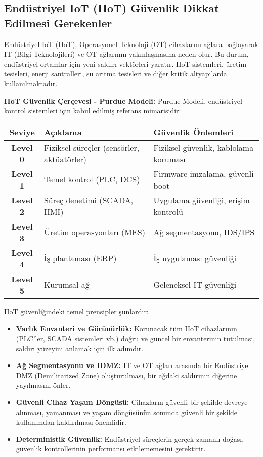\subsection{Endüstriyel IoT (IIoT) Güvenlik Dikkat Edilmesi Gerekenler}

Endüstriyel IoT (IIoT), Operasyonel Teknoloji (OT) cihazlarını ağlara bağlayarak IT (Bilgi Teknolojileri) ve OT ağlarının yakınlaşmasına neden olur. Bu durum, endüstriyel ortamlar için yeni saldırı vektörleri yaratır. IIoT sistemleri, üretim tesisleri, enerji santralleri, su arıtma tesisleri ve diğer kritik altyapılarda kullanılmaktadır.

\textbf{IIoT Güvenlik Çerçevesi - Purdue Modeli:}
Purdue Modeli, endüstriyel kontrol sistemleri için kabul edilmiş referans mimarisidir:

\begin{tabularx}{\textwidth}{|c|X|X|}
\hline
\textbf{Seviye} & \textbf{Açıklama} & \textbf{Güvenlik Önlemleri} \\
\hline
\textbf{Level 0} & Fiziksel süreçler (sensörler, aktüatörler) & Fiziksel güvenlik, kablolama koruması \\
\hline
\textbf{Level 1} & Temel kontrol (PLC, DCS) & Firmware imzalama, güvenli boot \\
\hline
\textbf{Level 2} & Süreç denetimi (SCADA, HMI) & Uygulama güvenliği, erişim kontrolü \\
\hline
\textbf{Level 3} & Üretim operasyonları (MES) & Ağ segmentasyonu, IDS/IPS \\
\hline
\textbf{Level 4} & İş planlaması (ERP) & İş uygulaması güvenliği \\
\hline
\textbf{Level 5} & Kurumsal ağ & Geleneksel IT güvenliği \\
\hline
\end{tabularx}

IIoT güvenliğindeki temel prensipler şunlardır:
\begin{itemize}
    \item \textbf{Varlık Envanteri ve Görünürlük:} Korunacak tüm IIoT cihazlarının (PLC'ler, SCADA sistemleri vb.) doğru ve güncel bir envanterinin tutulması, saldırı yüzeyini anlamak için ilk adımdır.
    \item \textbf{Ağ Segmentasyonu ve IDMZ:} IT ve OT ağları arasında bir Endüstriyel DMZ (Demilitarized Zone) oluşturulması, bir ağdaki saldırının diğerine yayılmasını önler.
    \item \textbf{Güvenli Cihaz Yaşam Döngüsü:} Cihazların güvenli bir şekilde devreye alınması, yamanması ve yaşam döngüsünün sonunda güvenli bir şekilde kullanımdan kaldırılması önemlidir.
    \item \textbf{Deterministik Güvenlik:} Endüstriyel süreçlerin gerçek zamanlı doğası, güvenlik kontrollerinin performansı etkilememesini gerektirir.
\end{itemize}

